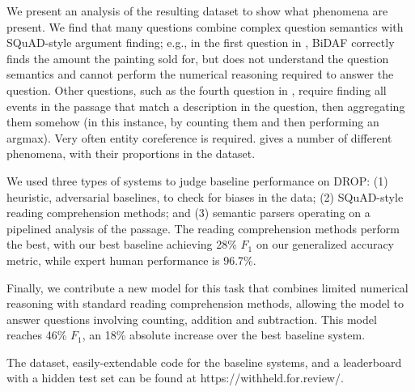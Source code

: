 We present an analysis of the resulting dataset to show what phenomena are present.  We find that many questions combine complex question semantics with SQuAD-style argument finding; e.g., in the first question in , BiDAF correctly finds the amount the painting sold for, but does not understand the question semantics and cannot perform the numerical reasoning required to answer the question.  Other questions, such as the fourth question in , require finding all events in the passage that match a description in the question, then aggregating them somehow (in this instance, by counting them and then performing an argmax).  Very often entity coreference is required.   gives a number of different phenomena, with their proportions in the dataset. 

We used three types of systems to judge baseline performance on DROP: (1) heuristic, adversarial baselines, to check for biases in the data; (2) SQuAD-style reading comprehension methods; and (3) semantic parsers operating on a pipelined analysis of the passage.  The reading comprehension methods perform the best, with our best baseline achieving 28\% $F_1$ on our generalized accuracy metric, while expert human performance is 96.7\%.

Finally, we contribute a new model for this task that combines limited numerical reasoning with standard reading comprehension methods, allowing the model to answer questions involving counting, addition and subtraction.  This model reaches 46\% $F_1$, an 18\% absolute increase over the best baseline system.

The dataset, easily-extendable code for the baseline systems, and a leaderboard with a hidden test set can be found at https://withheld.for.review/.